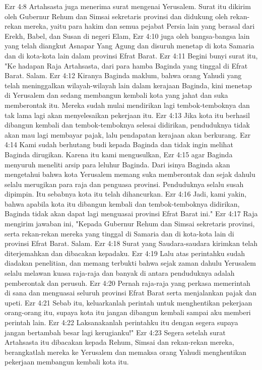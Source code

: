 Ezr 4:8  Artahsasta juga menerima surat mengenai Yerusalem. Surat itu dikirim oleh Gubernur Rehum dan Simsai sekretaris provinsi dan didukung oleh rekan-rekan mereka, yaitu para hakim dan semua pejabat Persia lain yang berasal dari Erekh, Babel, dan Susan di negeri Elam,
Ezr 4:10  juga oleh bangsa-bangsa lain yang telah diangkut Asnapar Yang Agung dan disuruh menetap di kota Samaria dan di kota-kota lain dalam provinsi Efrat Barat.
Ezr 4:11  Begini bunyi surat itu, "Ke hadapan Raja Artahsasta, dari para hamba Baginda yang tinggal di Efrat Barat. Salam.
Ezr 4:12  Kiranya Baginda maklum, bahwa orang Yahudi yang telah meninggalkan wilayah-wilayah lain dalam kerajaan Baginda, kini menetap di Yerusalem dan sedang membangun kembali kota yang jahat dan suka memberontak itu. Mereka sudah mulai mendirikan lagi tembok-temboknya dan tak lama lagi akan menyelesaikan pekerjaan itu.
Ezr 4:13  Jika kota itu berhasil dibangun kembali dan tembok-temboknya selesai didirikan, penduduknya tidak akan mau lagi membayar pajak, lalu pendapatan kerajaan akan berkurang.
Ezr 4:14  Kami sudah berhutang budi kepada Baginda dan tidak ingin melihat Baginda dirugikan. Karena itu kami mengusulkan,
Ezr 4:15  agar Baginda menyuruh meneliti arsip para leluhur Baginda. Dari isinya Baginda akan mengetahui bahwa kota Yerusalem memang suka memberontak dan sejak dahulu selalu merugikan para raja dan penguasa provinsi. Penduduknya selalu susah dipimpin. Itu sebabnya kota itu telah dihancurkan.
Ezr 4:16  Jadi, kami yakin, bahwa apabila kota itu dibangun kembali dan tembok-temboknya didirikan, Baginda tidak akan dapat lagi menguasai provinsi Efrat Barat ini."
Ezr 4:17  Raja mengirim jawaban ini, "Kepada Gubernur Rehum dan Simsai sekretaris provinsi, serta rekan-rekan mereka yang tinggal di Samaria dan di kota-kota lain di provinsi Efrat Barat. Salam.
Ezr 4:18  Surat yang Saudara-saudara kirimkan telah diterjemahkan dan dibacakan kepadaku.
Ezr 4:19  Lalu atas perintahku sudah diadakan penelitian, dan memang terbukti bahwa sejak zaman dahulu Yerusalem selalu melawan kuasa raja-raja dan banyak di antara penduduknya adalah pemberontak dan perusuh.
Ezr 4:20  Pernah raja-raja yang perkasa memerintah di sana dan menguasai seluruh provinsi Efrat Barat serta menjalankan pajak dan upeti.
Ezr 4:21  Sebab itu, keluarkanlah perintah untuk menghentikan pekerjaan orang-orang itu, supaya kota itu jangan dibangun kembali sampai aku memberi perintah lain.
Ezr 4:22  Laksanakanlah perintahku itu dengan segera supaya jangan bertambah besar lagi kerugianku!"
Ezr 4:23  Segera setelah surat Artahsasta itu dibacakan kepada Rehum, Simsai dan rekan-rekan mereka, berangkatlah mereka ke Yerusalem dan memaksa orang Yahudi menghentikan pekerjaan membangun kembali kota itu.
